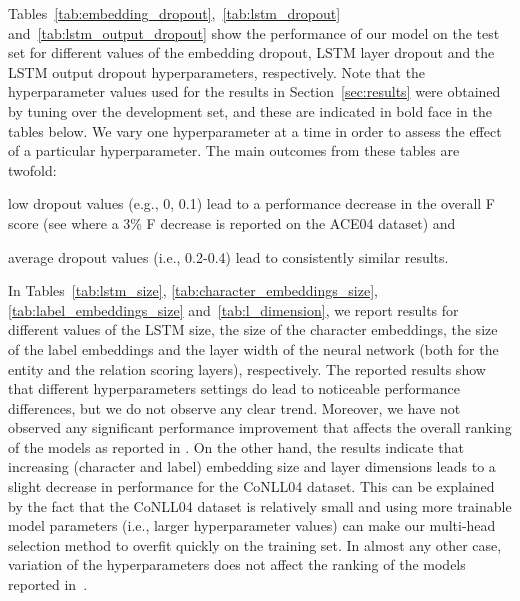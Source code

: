 \documentclass[review]{elsarticle}
\newcommand{\eg}{e.g., }
\newcommand{\ie}{i.e., }
\newcommand{\secref}[1]{Section~\ref{#1}}
\begin{document}
Tables~\ref{tab:embedding_dropout},~\ref{tab:lstm_dropout} and~\ref{tab:lstm_output_dropout}
show the performance of our model on the test set for different values of the embedding dropout, LSTM layer dropout and the LSTM output dropout hyperparameters, respectively. 
Note that the hyperparameter values used for the results in \secref{sec:results} were obtained by tuning over the development set, and these are indicated in bold face in the tables below.
We vary one hyperparameter at a time in order to assess the effect of a particular hyperparameter. The main outcomes from these tables are twofold: 
\begin{enumerate*}[label=(\roman*)]
\item low dropout values (\eg 0, 0.1) lead to a performance decrease in the overall F score (see  where a 3\% F decrease is reported on the ACE04 dataset) and
\item average dropout values (\ie 0.2-0.4) lead to consistently similar results.
\end{enumerate*}

In Tables~\ref{tab:lstm_size}, \ref{tab:character_embeddings_size}, \ref{tab:label_embeddings_size} and~\ref{tab:l_dimension}, we report results for different values of the LSTM size, the size of the character embeddings, the size of the label embeddings and the layer width of the neural network  (both for the entity and the relation scoring layers), respectively. 
The reported results show that different hyperparameters settings do lead to noticeable performance differences, but we do not observe any clear trend. Moreover, we have not observed any significant performance improvement that affects the overall ranking of the models as reported in . On the other hand, the results indicate that increasing (character and label) embedding size and layer dimensions leads to a slight decrease in performance for the CoNLL04 dataset. This can be explained by the fact that the CoNLL04 dataset is relatively small and using more trainable model parameters (\ie larger hyperparameter values) can make our multi-head selection method to overfit quickly on the training set. In almost any other case, variation of the hyperparameters does not affect the ranking of the models reported in~.
\end{document}
